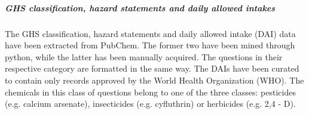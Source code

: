\subparagraph{GHS classification, hazard statements and daily allowed intakes}

The GHS classification, hazard statements and daily allowed intake (DAI) data have been extracted from PubChem. \cite{pubchem}
The former two have been mined through python, while the latter has been manually acquired. The questions in their respective category are formatted in the same way.
The DAIs have been curated to contain only records approved by the World Health Organization (WHO). 
The chemicals in this class of questions belong to one of the three classes: pesticides (e.g. calcium arsenate), insecticides (e.g. cyfluthrin) or herbicides (e.g. 2,4 - D). 
